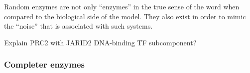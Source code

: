                 Random enzymes are not only “enzymes” in the true sense of the word when compared to the biological side of the model. They also exist in order to mimic the “noise” that is associated with such systems.

                \begin{itemize}
                    {
                        \color{red}
                        \item Explain PRC2 with JARID2 DNA-binding TF subcomponent?
                    }
                \end{itemize}
            \subsubsection*{Completer enzymes}
